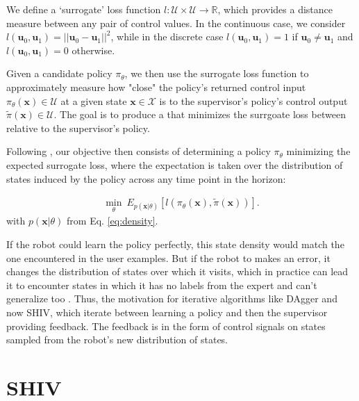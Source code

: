 \documentclass[10pt, conference]{ieeeconf}      %
\newcommand{\bu}{\mathbf{u}}
\newcommand{\bx}{\mathbf{x}}
\begin{document}
We define a `surrogate' loss function $l:\mathcal{U}\times \mathcal{U}\to \mathbb{R}$, which provides a distance
measure between any pair of control values. In the continuous case, we consider $l(\bu_0,\bu_1) = ||\bu_0-\bu_1||^2$,
while in the discrete case $l(\bu_0,\bu_1) = 1$ if $\bu_0 \neq \bu_1$ and $l(\bu_0, \bu_1)=0$ otherwise.

Given a candidate policy $\pi_{\theta}$, we then use the surrogate loss function to approximately measure how "close" the policy's
returned control input $\pi_{\theta}(\bx)\in \mathcal{U}$ at a given state $\bx\in \mathcal{X}$ is to the supervisor's policy's control output
$\tilde{\pi}(\bx)\in \mathcal{U}$. The goal is to produce a that minimizes the surrgoate loss between relative to the supervisor's policy.


Following \cite{ross2010reduction}, our objective then consists of determining a policy $\pi_{\theta}$ minimizing the expected surrogate loss, where the expectation is taken over the distribution of states induced by the policy across any time point in the horizon:

 \vspace{-2ex}
\begin{align}\label{eq:LFD_obj}
\underset{\theta}{\min} \: E_{p(\bx|\theta)} [l(\pi_\theta(\bx),\tilde{\pi}(\bx))].
\end{align}
with $p(\bx|\theta)$ from Eq. \ref{eq:density}.

 If the robot could learn the policy  perfectly, this state density would match the one encountered in the user examples. But if the robot to makes an error, it changes the distribution of states over which it visits, which in practice can lead it to encounter states in which it has no labels from the expert and can't generalize too \cite{pomerleau1989alvinn}. Thus, the motivation for iterative algorithms like DAgger and now SHIV, which iterate between learning a policy and then the supervisor providing feedback. The feedback is in the form of control signals on states sampled from the robot's new distribution of states. 


\section{SHIV} \label{sec:SHIV}
\end{document}
